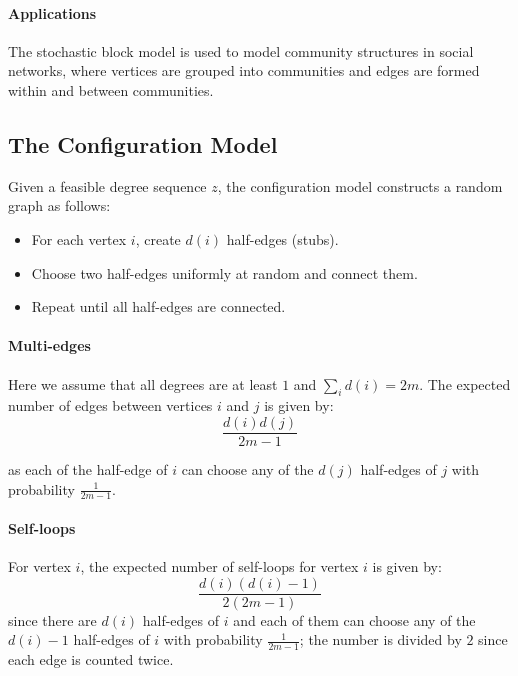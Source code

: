 \documentclass{article}
\begin{document}
\paragraph{Applications}
    The stochastic block model is used to model community structures in social networks, where vertices are grouped into communities and edges are formed within and between communities. 



\subsection{The Configuration Model}  
Given a feasible degree sequence $z$, the configuration model constructs a random graph as follows: 
\begin{itemize}
    \item For each vertex $i$, create $d(i)$ half-edges (stubs).
    \item Choose two half-edges uniformly at random and connect them.
    \item Repeat until all half-edges are connected.
\end{itemize}

\paragraph{Multi-edges} Here we assume that all degrees are at least $1$ and $\sum_i d(i) = 2m$. The expected number of edges between vertices $i$ and $j$ is given by:
\begin{equation*}
    \frac{d(i)d(j)}{2m-1}
\end{equation*}

as each of the half-edge of $i$ can choose any of the $d(j)$ half-edges of $j$ with probability $\frac{1}{2m-1}$.  

\paragraph{Self-loops} For vertex $i$, the expected number of self-loops for vertex $i$ is given by:
\begin{equation*}
    \frac{d(i) (d(i)-1)}{2(2m-1)}
\end{equation*}
since there are $d(i)$ half-edges of $i$ and each of them can choose any of the $d(i)-1$ half-edges of $i$ with probability $\frac{1}{2m-1}$; the number is divided by $2$ since each edge is counted twice.  
\end{document}
